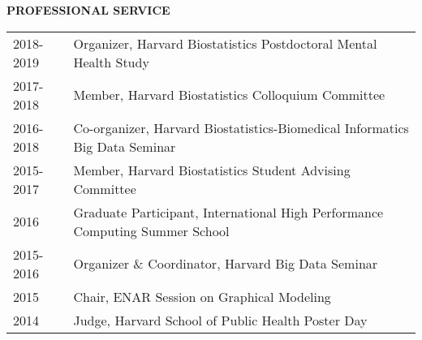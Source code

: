 \documentclass[10pt]{article}
\begin{document}
	
{ \bf PROFESSIONAL SERVICE} \hrulefill \\
\setlength\intextsep{0mm}
\begin{center}
	\begin{table}[H]
		\centering
		\begin{tabular}{@{}p{2cm}@{}@{}p{14.9cm}@{}}
			2018-2019  & Organizer, Harvard Biostatistics Postdoctoral Mental Health Study         \\ 
			2017-2018  & Member, Harvard Biostatistics Colloquium Committee          \\ 
			2016-2018  & Co-organizer, Harvard Biostatistics-Biomedical Informatics Big Data Seminar             \\ 
			2015-2017  & Member, Harvard Biostatistics Student Advising Committee    \\ 
			2016  & Graduate Participant, International High Performance Computing Summer School   \\ 
			2015-2016  & Organizer \& Coordinator, Harvard Big Data Seminar    \\ 
			2015  & Chair, ENAR Session on Graphical Modeling  \\ 
			2014  & Judge, Harvard School of Public Health Poster Day 
		\end{tabular}
	\end{table}
\end{center}




%
%
%
%
\end{document}
